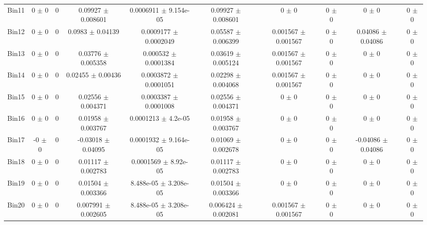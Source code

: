 \begin{tabular}{@{\extracolsep{4pt}}lccccccccc@{}}
     Bin11 & 0 $\pm$ 0 & 0 & 0.09927 $\pm$ 0.008601 & 0.0006911 $\pm$ 9.154e-05 & 0.09927 $\pm$ 0.008601 & 0 $\pm$ 0 & 0 $\pm$ 0 & 0 $\pm$ 0 & 0 $\pm$ 0 \\ 
     Bin12 & 0 $\pm$ 0 & 0 & 0.0983 $\pm$ 0.04139 & 0.0009177 $\pm$ 0.0002049 & 0.05587 $\pm$ 0.006399 & 0.001567 $\pm$ 0.001567 & 0 $\pm$ 0 & 0.04086 $\pm$ 0.04086 & 0 $\pm$ 0 \\ 
     Bin13 & 0 $\pm$ 0 & 0 & 0.03776 $\pm$ 0.005358 & 0.000532 $\pm$ 0.0001384 & 0.03619 $\pm$ 0.005124 & 0.001567 $\pm$ 0.001567 & 0 $\pm$ 0 & 0 $\pm$ 0 & 0 $\pm$ 0 \\ 
     Bin14 & 0 $\pm$ 0 & 0 & 0.02455 $\pm$ 0.00436 & 0.0003872 $\pm$ 0.0001051 & 0.02298 $\pm$ 0.004068 & 0.001567 $\pm$ 0.001567 & 0 $\pm$ 0 & 0 $\pm$ 0 & 0 $\pm$ 0 \\ 
     Bin15 & 0 $\pm$ 0 & 0 & 0.02556 $\pm$ 0.004371 & 0.0003387 $\pm$ 0.0001008 & 0.02556 $\pm$ 0.004371 & 0 $\pm$ 0 & 0 $\pm$ 0 & 0 $\pm$ 0 & 0 $\pm$ 0 \\ 
     Bin16 & 0 $\pm$ 0 & 0 & 0.01958 $\pm$ 0.003767 & 0.0001213 $\pm$ 4.2e-05 & 0.01958 $\pm$ 0.003767 & 0 $\pm$ 0 & 0 $\pm$ 0 & 0 $\pm$ 0 & 0 $\pm$ 0 \\ 
     Bin17 & -0 $\pm$ 0 & 0 & -0.03018 $\pm$ 0.04095 & 0.0001932 $\pm$ 9.164e-05 & 0.01069 $\pm$ 0.002678 & 0 $\pm$ 0 & 0 $\pm$ 0 & -0.04086 $\pm$ 0.04086 & 0 $\pm$ 0 \\ 
     Bin18 & 0 $\pm$ 0 & 0 & 0.01117 $\pm$ 0.002783 & 0.0001569 $\pm$ 8.92e-05 & 0.01117 $\pm$ 0.002783 & 0 $\pm$ 0 & 0 $\pm$ 0 & 0 $\pm$ 0 & 0 $\pm$ 0 \\ 
     Bin19 & 0 $\pm$ 0 & 0 & 0.01504 $\pm$ 0.003366 & 8.488e-05 $\pm$ 3.208e-05 & 0.01504 $\pm$ 0.003366 & 0 $\pm$ 0 & 0 $\pm$ 0 & 0 $\pm$ 0 & 0 $\pm$ 0 \\ 
     Bin20 & 0 $\pm$ 0 & 0 & 0.007991 $\pm$ 0.002605 & 8.488e-05 $\pm$ 3.208e-05 & 0.006424 $\pm$ 0.002081 & 0.001567 $\pm$ 0.001567 & 0 $\pm$ 0 & 0 $\pm$ 0 & 0 $\pm$ 0 \\ 
\hline\hline
  \end{tabular}
